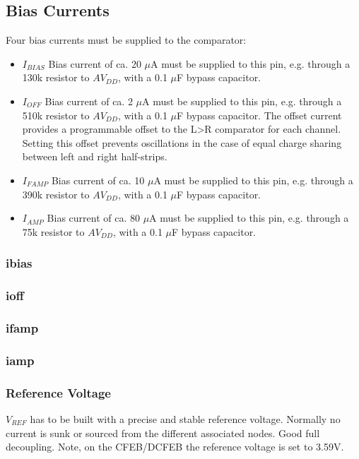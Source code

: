 \documentclass[letterpaper]{article}
\begin{document}
\subsection{Bias Currents}

Four bias currents must be supplied to the comparator:

\begin{itemize}
    \item $I_{BIAS}$ Bias current of ca. 20 $\mu$A must be supplied to this pin, e.g. through a 130k resistor to $AV_{DD}$, with a 0.1 $\mu$F bypass capacitor.
    \item $I_{OFF}$  Bias current of ca. 2 $\mu$A must be supplied to this pin, e.g. through a 510k resistor to $AV_{DD}$, with a 0.1 $\mu$F bypass capacitor.  The offset current provides a programmable offset to the L>R comparator for each channel. Setting this offset prevents oscillations in the case of equal charge sharing between left and right half-strips.
    \item $I_{FAMP}$   Bias current of ca. 10 $\mu$A must be supplied to this pin, e.g. through a 390k resistor to $AV_{DD}$, with a 0.1 $\mu$F bypass capacitor.
    \item $I_{AMP}$    Bias current of ca. 80 $\mu$A must be supplied to this pin, e.g. through a 75k resistor to $AV_{DD}$, with a 0.1 $\mu$F bypass capacitor.

\end{itemize}

\subsubsection{ibias}
\subsubsection{ioff}
\subsubsection{ifamp}
\subsubsection{iamp}

\subsubsection{Reference Voltage}

$V_{REF}$ has to be built with a precise and stable reference voltage.  Normally no current is sunk or sourced from the different associated nodes. Good full decoupling. Note, on the CFEB/DCFEB the reference voltage is set to 3.59V.
\end{document}
